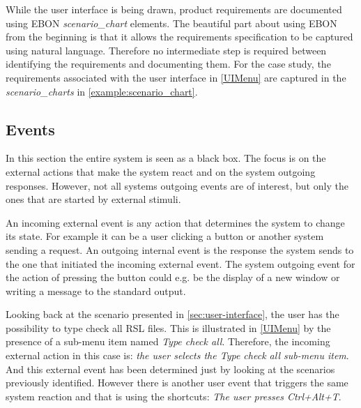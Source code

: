 \documentclass[conference]{IEEEtran}
\begin{document}


While the user interface is being drawn, product requirements are
documented using EBON \emph{scenario\_chart} elements.  The beautiful
part about using EBON from the beginning is that it allows the
requirements specification to be captured using natural language.
Therefore no intermediate step is required between identifying the
requirements and documenting them.  
For the case study, the requirements associated with the user
interface in \autoref{UIMenu} are captured in the
\emph{scenario\_charts} in \autoref{example:scenario_chart}.

%
\subsection{Events}
\label{sec:events}

In this section the entire system is seen as a black box. The focus is
on the external actions that make the system react and on the system
outgoing responses. However, not all systems outgoing events are of
interest, but only the ones that are started by external stimuli. 

An incoming external event is any action that determines the system to
change its state. For example it can be a user clicking a button or
another system sending a request. An outgoing internal event is the
response the system sends to the one that initiated the incoming
external event. The system outgoing event for the action of pressing
the button could e.g. be the display of a new window or writing a
message to the standard output.

Looking back at the scenario presented in
\autoref{sec:user-interface}, the user has the possibility to type
check all RSL files. This is illustrated in \autoref{UIMenu} by the
presence of a sub-menu item named \emph{Type check all}. Therefore,
the incoming external action in this case is: \emph{the user selects
the Type check all sub-menu item}. And this external event has been determined
just by looking at the scenarios previously identified. However there
is another user event that triggers the same system reaction and that
is using the shortcuts: \emph{The user presses Ctrl+Alt+T}.


\end{document}
